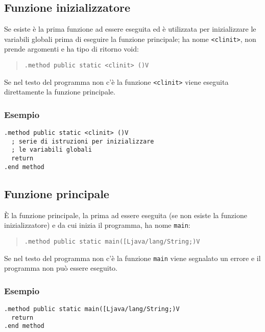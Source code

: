 \subsection{Funzione inizializzatore}
Se esiste \`e la prima funzione ad essere eseguita ed \`e utilizzata per inizializzare le variabili globali prima di eseguire la funzione principale; ha nome \texttt{<clinit>}, non prende argomenti e ha tipo di ritorno void:
\begin{quote}
  \texttt{.method public static <clinit> ()V}
\end{quote}
Se nel testo del programma non c'\`e la funzione \texttt{<clinit>} viene eseguita direttamente la funzione principale.
\subsubsection*{Esempio}
\begin{verbatim}
.method public static <clinit> ()V
  ; serie di istruzioni per inizializzare
  ; le variabili globali
  return
.end method
\end{verbatim}

\subsection{Funzione principale}
\`E la funzione principale, la prima ad essere eseguita (se non esiste la funzione inizializzatore) e da cui inizia il programma, ha nome \texttt{main}:
\begin{quote}
  \texttt{.method public static main([Ljava/lang/String;)V}
\end{quote}
Se nel testo del programma non c'\`e la funzione \texttt{main} viene segnalato un errore e il programma non pu\`o essere eseguito.
\subsubsection*{Esempio}
\begin{verbatim}
.method public static main([Ljava/lang/String;)V
  return
.end method
\end{verbatim}
